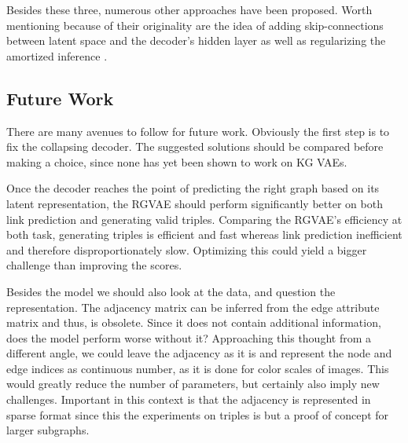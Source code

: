 





Besides these three, numerous other approaches have been proposed. Worth mentioning because of their originality are the idea of adding skip-connections between latent space and the decoder's hidden layer \cite{dieng_avoiding_2019} as well as regularizing the amortized inference \cite{shu_amortized_2019}.  







\subsection{Future Work}

There are many avenues to follow for future work. Obviously the first step is to fix the collapsing decoder. The suggested solutions should be compared before making a choice, since none has yet been shown to work on KG VAEs.

Once the decoder reaches the point of predicting the right graph based on its latent representation, the RGVAE should perform significantly better on both link prediction and generating valid triples. Comparing the RGVAE's efficiency at both task, generating triples is efficient and fast whereas link prediction inefficient and therefore disproportionately slow. Optimizing this could yield a bigger challenge than improving the scores. 

Besides the model we should also look at the data, and question the representation. The adjacency matrix can be inferred from the edge attribute matrix and thus, is obsolete. Since it does not contain additional information, does the model perform worse without it? Approaching this thought from a different angle, we could leave the adjacency as it is and represent the node and edge indices as continuous number, as it is done for color scales of images. This would greatly reduce the number of parameters, but certainly also imply new challenges. Important in this context is that the adjacency is represented in sparse format since this the experiments on triples is but a proof of concept for larger subgraphs. 

